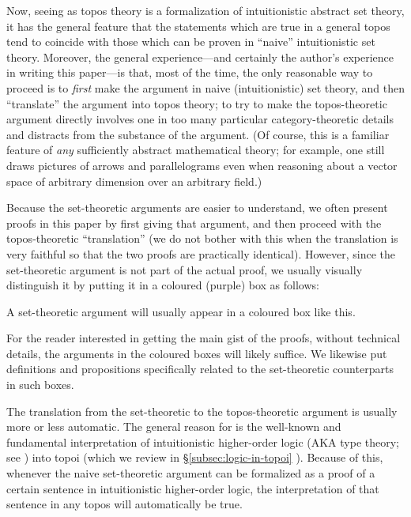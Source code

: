 \documentclass{amsart}
\newcommand\prerefpost[3]{%
  \texorpdfstring%
    {\hyperref[#2]{#1\ref*{#2}#3}}%
    {#1\ref*{#2}#3}%
}
\newcommand\sref[1]{\prerefpost{\S}{#1}{}}
\theoremstyle{definition}
\theoremstyle{remark}
\theoremstyle{plainwithref}
\newenvironment{settybox}{\begin{tcolorbox}[colback=blue!20,breakable%
    ,enhanced%
    ,sharp corners%
    ,frame hidden%
    ,boxsep=0pt
    ,left=5pt,right=5pt,top=5pt,bottom=5pt
    ,enlarge left by=-5pt,width=\linewidth+10pt
    ,enlarge top by=5pt,enlarge bottom by=5pt
    ,before skip balanced=0pt,after skip balanced=0pt
    ]}{\end{tcolorbox}}
\begin{document}
Now, seeing as topos theory is a formalization of intuitionistic abstract set theory, it has the general feature that the statements which are true in a general topos tend to coincide with those which can be proven in ``naive'' intuitionistic set theory.
Moreover, the general experience---and certainly the author's experience in writing this paper---is that, most of the time, the only reasonable way to proceed is to \emph{first} make the argument in naive (intuitionistic) set theory, and then ``translate'' the argument into topos theory; to try to make the topos-theoretic argument directly involves one in too many particular category-theoretic details and distracts from the substance of the argument.
(Of course, this is a familiar feature of \emph{any} sufficiently abstract mathematical theory; for example, one still draws pictures of arrows and parallelograms even when reasoning about a vector space of arbitrary dimension over an arbitrary field.)

Because the set-theoretic arguments are easier to understand, we often present proofs in this paper by first giving that argument, and then proceed with the topos-theoretic ``translation'' (we do not bother with this when the translation is very faithful so that the two proofs are practically identical).
However, since the set-theoretic argument is not part of the actual proof, we usually visually distinguish it by putting it in a coloured (purple) box as follows:
\begin{settybox}
  A set-theoretic argument will usually appear in a coloured box like this.
\end{settybox}
For the reader interested in getting the main gist of the proofs, without technical details, the arguments in the coloured boxes will likely suffice.
We likewise put definitions and propositions specifically related to the set-theoretic counterparts in such boxes.

The translation from the set-theoretic to the topos-theoretic argument is usually more or less automatic.
The general reason for is the well-known and fundamental interpretation of intuitionistic higher-order logic (AKA type theory; see \cite{lambek-scott}) into topoi (which we review in \sref{subsec:logic-in-topoi}).
Because of this, whenever the naive set-theoretic argument can be formalized as a proof of a certain sentence in intuitionistic higher-order logic, the interpretation of that sentence in any topos will automatically be true.
\end{document}
